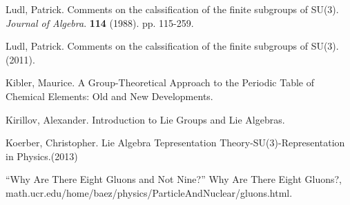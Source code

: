 \documentclass[12pt]{article}
\begin{document}
\newpage
\begin{thebibliography}{book}
 Ludl, Patrick. Comments on the calssification of the finite subgroups of SU(3). {\it Journal of Algebra}. {\bf 114} (1988). pp. 115-259. 

 Ludl, Patrick. Comments on the calssification of the finite subgroups of SU(3).(2011).

 Kibler, Maurice. A Group-Theoretical Approach to the Periodic Table of Chemical Elements: Old and New Developments.

 Kirillov, Alexander. Introduction to Lie Groups and Lie Algebras. 

 Koerber, Christopher. Lie Algebra Tepresentation Theory-SU(3)-Representation in Physics.(2013) 

\bibitem{} “Why Are There Eight Gluons and Not Nine?” Why Are There Eight Gluons?, math.ucr.edu/home/baez/physics/ParticleAndNuclear/gluons.html. 
\end{thebibliography}




\end{document}

